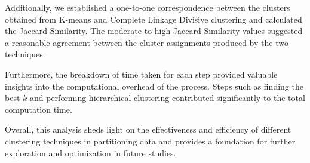 \documentclass[12pt]{article}
\begin{document}
Additionally, we established a one-to-one correspondence between the clusters obtained from K-means and Complete Linkage Divisive clustering and calculated the Jaccard Similarity. The moderate to high Jaccard Similarity values suggested a reasonable agreement between the cluster assignments produced by the two techniques.

Furthermore, the breakdown of time taken for each step provided valuable insights into the computational overhead of the process. Steps such as finding the best \( k \) and performing hierarchical clustering contributed significantly to the total computation time.

Overall, this analysis sheds light on the effectiveness and efficiency of different clustering techniques in partitioning data and provides a foundation for further exploration and optimization in future studies.
\end{document}
